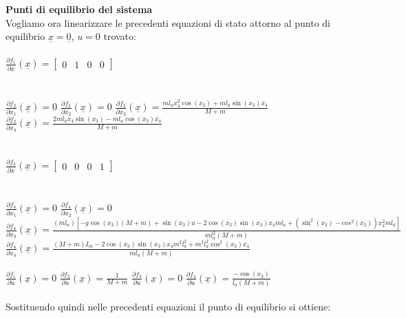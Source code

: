 \textbf{Punti di equilibrio del sistema} \\
Vogliamo ora linearizzare le precedenti equazioni di stato attorno al punto di equilibrio $\underline{x}=\underline{0}$, $u=0$ trovato: \\\\
$\displaystyle\frac{\partial{f_1}}{\partial{\underline{x}}}(\underline x)=
\begin{bmatrix}
0&1&0&0
\end{bmatrix}$\\\\\\
$\displaystyle\frac{\partial{f_2}}{\partial{x_1}}(\underline{x})=0$\quad
$\displaystyle\frac{\partial{f_2}}{\partial{x_2}}(\underline{x})=0$\quad
$\displaystyle\frac{\partial{f_2}}{\partial{x_3}}(\underline{x})=\displaystyle\frac{ml_ax_4^2\cos(x_3)+ml_a\sin(x_3)\dot{x_4}}{M+m}$\\
$\displaystyle\frac{\partial{f_2}}{\partial{x_4}}(\underline{x})=\displaystyle\frac{2ml_ax_4\sin(x_3)-ml_a\cos(x_3)\ddot{x_4}}{M+m}$\\\\\\
$\displaystyle\frac{\partial{f_3}}{\partial{\underline{x}}}(\underline x)=
\begin{bmatrix}
0&0&0&1
\end{bmatrix}$\\\\\\
$\displaystyle\frac{\partial{f_4}}{\partial{x_1}}(\underline{x})=0$\quad
$\displaystyle\frac{\partial{f_4}}{\partial{x_2}}(\underline{x})=0$\\
$\displaystyle\frac{\partial{f_4}}{\partial{x_3}}(\underline{x})=\displaystyle\frac{(ml_a)[-g\cos(x_3)(M+m)+\sin(x_3)u-2\cos(x_3)\sin(x_3)\dot{x_4}ml_a+(\sin^2(x_3)-cos^2(x_3))x^2_4ml_a]}{ml_a^2(M+m)}$\quad
$\displaystyle\frac{\partial{f_4}}{\partial{x_4}}(\underline{x})=\displaystyle\frac{(M+m)I_m-2\cos(x_3)\sin(x_3)x_4m^2l_a^2+m^2l_a^2\cos^2(x_3)\ddot{x_4}}{ml_a(M+m)}$\\\\
$\displaystyle\frac{\partial{f_1}}{\partial{u}}(\underline{x})=0$\quad
$\displaystyle\frac{\partial{f_2}}{\partial{u}}(\underline{x})=\displaystyle\frac{1}{M+m}$\quad
$\displaystyle\frac{\partial{f_3}}{\partial{u}}(\underline{x})=0$\quad
$\displaystyle\frac{\partial{f_4}}{\partial{u}}(\underline{x})=\displaystyle\frac{-\cos(x_3)}{l_a(M+m)}$\\\\
Sostituendo quindi nelle precedenti equazioni il punto di equilibrio si ottiene:\\\\
